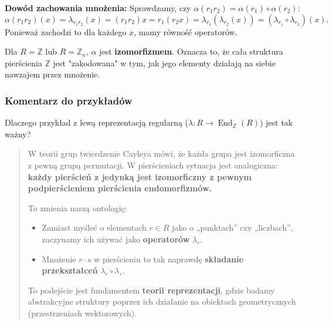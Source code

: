\begin{enumerate}[label=\arabic*)]
\textbf{Dowód zachowania mnożenia:}
Sprawdzamy, czy $\alpha(r_1 r_2) = \alpha(r_1) \circ \alpha(r_2)$:
\[ \alpha(r_1 r_2)(x) = \lambda_{r_1 r_2}(x) = (r_1 r_2)x = r_1(r_2 x) = \lambda_{r_1}(\lambda_{r_2}(x)) = (\lambda_{r_1} \circ \lambda_{r_2})(x). \]
Ponieważ zachodzi to dla każdego $x$, mamy równość operatorów.

Dla $R = \mathbb{Z}$ lub $R = \mathbb{Z}_n$, $\alpha$ jest \textbf{izomorfizmem}. Oznacza to, że cała struktura pierścienia $\mathbb{Z}$ jest "zakodowana" w tym, jak jego elementy działają na siebie nawzajem przez mnożenie.

\end{enumerate}

\subsubsection*{Komentarz do przykładów}

\begin{remark}
Dlaczego przykład z lewą reprezentacją regularną ($\lambda: R \to \operatorname{End}_{\mathbb{Z}}(R)$) jest tak ważny?

\begin{quote}
W teorii grup twierdzenie Cayleya mówi, że każda grupa jest izomorficzna z pewną grupą permutacji. W pierścieniach sytuacja jest analogiczna: \textbf{każdy pierścień z jedynką jest izomorficzny z pewnym podpierścieniem pierścienia endomorfizmów.}

To zmienia naszą ontologię:
\begin{itemize}
    \item Zamiast myśleć o elementach $r \in R$ jako o „punktach” czy „liczbach”, zaczynamy ich używać jako \textbf{operatorów} $\lambda_r$. 
    \item Mnożenie $r \cdot s$ w pierścieniu to tak naprawdę \textbf{składanie przekształceń} $\lambda_r \circ \lambda_s$.
\end{itemize}
To podejście jest fundamentem \textbf{teorii reprezentacji}, gdzie badamy abstrakcyjne struktury poprzez ich działanie na obiektach geometrycznych (przestrzeniach wektorowych).
\end{quote}
\end{remark}

